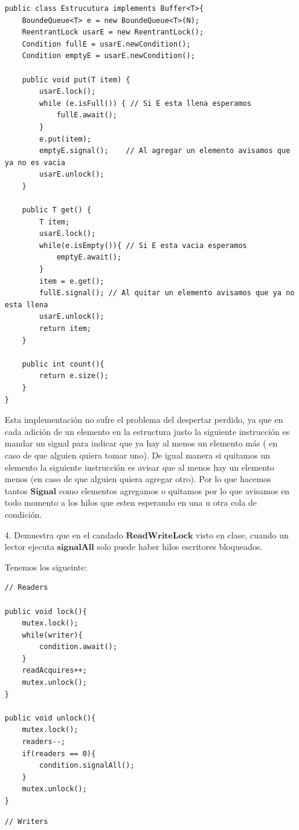 \documentclass[12pt, letterpaper]{article}
\begin{document}
\begin{itemize}
\begin{lstlisting}
public class Estrucutura implements Buffer<T>{
    BoundeQueue<T> e = new BoundeQueue<T>(N);
    ReentrantLock usarE = new ReentrantLock();
    Condition fullE = usarE.newCondition(); 
    Condition emptyE = usarE.newCondition();

    public void put(T item) {
        usarE.lock();
        while (e.isFull()) { // Si E esta llena esperamos
            fullE.await();
        }
        e.put(item); 
        emptyE.signal();	// Al agregar un elemento avisamos que ya no es vacia
        usarE.unlock();
    }

    public T get() {
        T item;
        usarE.lock();
        while(e.isEmpty()){	// Si E esta vacia esperamos
            emptyE.await();
        }
        item = e.get();
        fullE.signal();	// Al quitar un elemento avisamos que ya no esta llena
        usarE.unlock();
        return item;
    }

    public int count(){
        return e.size();
    }
}
\end{lstlisting}

Esta implementación no sufre el problema del despertar perdido, ya que en cada adición de un elemento en la estructura justo la siguiente instrucción es mandar un signal para indicar que ya hay al menos un elemento más ( en caso de que alguien quiera tomar uno). De igual manera si quitamos un elemento la siguiente instrucción es avisar que al menos hay un elemento menos (en caso de que alguien quiera agregar otro). Por lo que hacemos tantos $\textbf{Signal}$ como elementos agregamos o quitamos por lo que avisamos en todo momento a los hilos que esten esperando en una u otra cola de condición.

\item[4. ]Demuestra que en el candado $\textbf{ReadWriteLock}$ visto en clase, cuando un lector
ejecuta $\textbf{signalAll}$ solo puede haber hilos escritores bloqueados.

Tenemos los sigueinte:

\begin{minipage}{0.45\linewidth}
\begin{lstlisting}
// Readers

public void lock(){
	mutex.lock();
	while(writer){
		condition.await();
	}
	readAcquires++;
	mutex.unlock();
}

public void unlock(){
	mutex.lock();
	readers--;
	if(readers == 0){
		condition.signalAll();
	}
	mutex.unlock();
}
\end{lstlisting}
\end{minipage}
\hfill
\begin{minipage}{0.45\linewidth}
\begin{lstlisting}
// Writers


\end{lstlisting}
\end{minipage}
\end{itemize}
\end{document}
